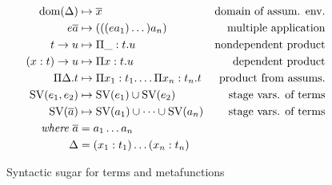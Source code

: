 \begin{figure}
\begin{align*}
\text{dom}(\Delta)        &\mapsto \overline{x}                           &\text{domain of assum. env.} \\
e \overline{a}      &\mapsto (((e a_1) \dots) a_n)                  &\text{multiple application} \\
t \to u             &\mapsto \Pi\_: t. u                            &\text{nondependent product} \\
(x: t) \to u        &\mapsto \Pi x: t. u                            &\text{dependent product} \\
\Pi\Delta.t         &\mapsto \Pi x_1: t_1. \dots \Pi x_n: t_n. t    &\text{product from assums.} \\
\text{SV}(e_1, e_2)       &\mapsto \text{SV}(e_1) \cup \text{SV}(e_2)                 &\text{stage vars. of terms} \\
\text{SV}(\overline{a})   &\mapsto \text{SV}(a_1) \cup \dots \cup \text{SV}(a_n)      &\text{stage vars. of terms} \\
\textit{where}\ \overline{a} &= a_1 \dots a_n \\
\Delta  &= (x_1: t_1) \dots (x_n: t_n)
\end{align*}
\caption{Syntactic sugar for terms and metafunctions}
\label{fig:sugar}
\end{figure}
